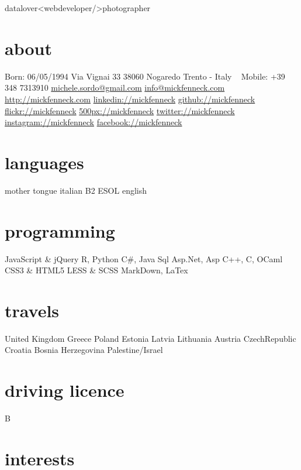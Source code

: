 \documentclass[]{friggeri-cv}
\begin{document}
       {datalover<webdeveloper/>photographer}


\begin{aside}
  \section{about}
    Born: 06/05/1994
    Via Vignai 33
    38060 Nogaredo
    Trento - Italy
    ~
    Mobile: +39 348 7313910
    \href{mailto:michele.sordo@gmail.com}{michele.sordo@gmail.com}
    \href{mailto:info@mickfenneck.com}{info@mickfenneck.com}
    \href{http://mickfenneck.com}{http://mickfenneck.com}
    \href{http://linkedin.com/in/mickfenneck}{linkedin://mickfenneck}
    \href{http://github.com/mickfenneck}{github://mickfenneck}
    \href{http://flickr.com/mickfenneck}{flickr://mickfenneck}
    \href{http://500px.com/mickfenneck}{500px://mickfenneck}
    \href{http://twitter.com/mickfenneck}{twitter://mickfenneck}
    \href{http://instagram.com/mickfenneck}{instagram://mickfenneck}
    \href{http://facebook.com/mickfenneck}{facebook://mickfenneck}
  \section{languages}
    mother tongue italian
    B2 ESOL english
  \section{programming}
    JavaScript \& jQuery
    R, Python
    C\#, Java
    Sql
    Asp.Net, Asp
    C++, C, OCaml
    CSS3 \& HTML5
    LESS \& SCSS
    MarkDown, LaTex
\section{travels}
    United Kingdom
    Greece
    Poland
    Estonia
    Latvia
    Lithuania
    Austria
    CzechRepublic
    Croatia
    Bosnia Herzegovina
    Palestine/Israel
\section{driving licence}
    B
\end{aside}






\section{interests}
\end{document}
